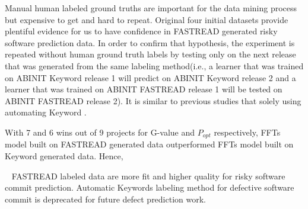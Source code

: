 \documentclass[sigconf,review, anonymous]{acmart}
\newenvironment{RQ}[1]%
{\noindent\begin{minipage}[c]{\linewidth}%
\begin{bclogo}[couleur=gray!25,%
                arrondi=0.1,%
                logo=\bctrombone,%
                ombre=true]{~#1}}%
{\end{bclogo}\end{minipage}\vspace{2mm}}
\begin{document}
Manual human labeled ground truths are important for the data mining process but expensive to get and hard to repeat. Original four initial datasets provide plentiful evidence for us to have confidence in FASTREAD generated risky software prediction data. In order to confirm that hypothesis, the experiment is repeated without human ground truth labels by testing only on the next release that was generated from the same labeling method(i.e., a learner that was trained on ABINIT Keyword release 1 will predict on ABINIT Keyword release 2 and a learner that was trained on ABINIT FASTREAD release 1 will be tested on ABINIT FASTREAD release 2). It is similar to previous studies that solely using automating Keyword  \cite{nayrolles18_clever, commitguru}. 


With 7 and 6 wins out of 9 projects for G-value and $P_{opt}$ respectively, FFTs model built on FASTREAD generated data outperformed FFTs model built on Keyword generated data. Hence, 

\begin{RQ}{}
\vspace{-10pt}
FASTREAD labeled data are more fit and higher quality for risky software commit prediction. Automatic Keywords labeling method for defective software commit is deprecated for future defect prediction work.  
\end{RQ}
\end{document}
